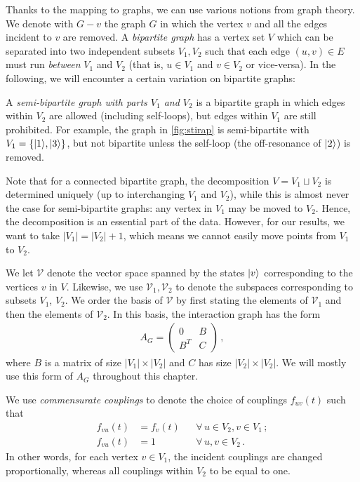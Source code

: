Thanks to the mapping to graphs, we can use various notions from graph theory. We denote with $G-v$ the graph $G$ in which the vertex $v$ and all the edges incident to $v$ are removed. A \emph{bipartite graph} has a vertex set $V$ which can be separated into two independent subsets $V_1, V_2$ such that each edge $(u,v) \in E$ must run \emph{between} $V_1$ and $V_2$ (that is, $u \in V_1$ and $v \in V_2$ or vice-versa). In the following, we will encounter a certain variation on bipartite graphs:
%
\begin{definition}
A \emph{semi-bipartite graph with parts $V_1$ and $V_2$} \cite{Xu2010,Al-Kofahi2009} is a bipartite graph in which edges within $V_2$ are allowed (including self-loops), but edges within $V_1$ are still prohibited. For example, the graph in \cref{fig:stirap} is semi-bipartite with $V_1 = \{ \lvert1\rangle, \lvert3\rangle \}$, but not bipartite unless the self-loop (the off-resonance of $\lvert2\rangle$) is removed.
\end{definition}
%
Note that for a connected bipartite graph, the decomposition $ V = V_1 \sqcup V_2$ is determined uniquely (up to interchanging $V_1$ and $V_2$), while this is almost never the case for semi-bipartite graphs: any vertex in $ V_1$ may be moved to $V_2$. Hence, the decomposition is an essential part of the data. However, for our results, we want to take $|V_1| = |V_2|+1$, which means we cannot easily move points from $V_1$ to $V_2$.

We let $\mathcal{V}$ denote the vector space spanned by the states $\lvert v\rangle$ corresponding to the vertices $v$ in $V$. Likewise, we use $\mathcal{V}_1, \mathcal{V}_2$ to denote the subspaces corresponding to subsets $V_1$, $V_2$. We order the basis of $\mathcal{V}$ by first stating the elements of $\mathcal{V}_1$ and then the elements of $\mathcal{V}_2$. In this basis, the interaction graph has the form
\begin{align}
A_G=\begin{pmatrix} 0 & B \\ B^T & C \end{pmatrix}\,,
\label{eq:bipgraph}
\end{align}
where $B$ is a matrix of size $|V_1| \times |V_2|$ and $C$ has size $|V_2| \times |V_2|$. We will mostly use this form of $A_G$ throughout this chapter. 


\begin{definition}
We use \emph{commensurate couplings} to denote the choice of couplings $f_{uv}(t)$ such that 
\begin{align*}
f_{v u}(t) &= f_v(t) && \forall\, u \in V_2,v\in V_1 \,;\\
f_{v u}(t) &= 1  && \forall\,  u,v \in V_2\,.
\end{align*}
In other words, for each vertex $v \in V_1$, the incident couplings are changed proportionally, whereas all couplings within $V_2$ to be equal to one.
\end{definition}

